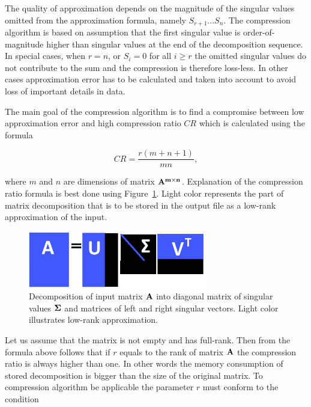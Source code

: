 The quality of approximation depends on the magnitude of the singular values omitted from the approximation formula, namely $S_{r+1} ...  S_{n}$. The compression algorithm is based on assumption that the first singular value is order-of-magnitude higher than singular values at the end of the decomposition sequence. In special cases, when $r=n$, or $S_{i}=0$ for all $i \geq r$ the omitted singular values do not contribute to the sum and the compression is therefore loss-less. In other cases approximation error has to be calculated and taken into account to avoid loss of important details in data.

The main goal of the compression algorithm is to find a compromise between low approximation error and high compression ratio $CR$ which is calculated using the formula

\begin{equation}
CR=\frac{r(m+n+1)}{m n},
\label{eq:cr-def}
\end{equation}

where $m$ and $n$ are dimensions of matrix $\mathbf{A^{m \times n}}$. Explanation of the compression ratio formula is best done using Figure~\ref{fig:lowrank_svd}. Light color represents the part of matrix decomposition that is to be stored in the output file as a low-rank approximation of the input.

\begin{figure}[H]
\centering\includegraphics[width=0.7\textwidth]{figures/low_rank_decomposition_diagram}
\caption{Decomposition of input matrix $\mathbf{A}$ into diagonal matrix of singular values $\mathbf{\Sigma}$ and matrices of left and right singular vectors. Light color illustrates low-rank approximation.}
\label{fig:lowrank_svd}
\end{figure}

Let us assume that the matrix is not empty and has full-rank. Then from the formula above follows that if $r$ equals to the rank of matrix $\mathbf{A}$ the compression ratio is always higher than one. In other words the memory consumption of stored decomposition is bigger than the size of the original matrix. To compression algorithm be applicable the parameter $r$ must conform to the condition

